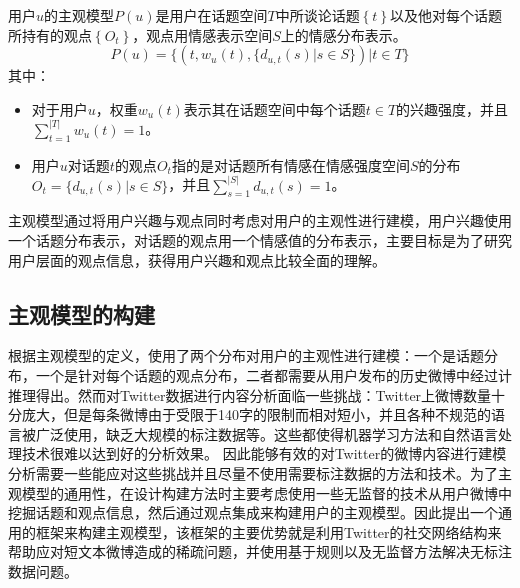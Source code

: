 \begin{definition}[主观模型]
用户$ u $的主观模型$ P \left( u \right) $是用户在话题空间$T$中所谈论话题$\left\lbrace  t \right\rbrace $以及他对每个话题所持有的观点$\left\lbrace O_{t}\right\rbrace $，观点用情感表示空间$ S $上的情感分布表示。
\begin{equation}
\label{usermodel}
P \left( u \right) = \lbrace \left( t, w_{u} \left( t \right), \lbrace d_{u,t} \left( s \right)|s \in S \rbrace \right) |  t \in T \rbrace
\end{equation}
其中：
\begin{itemize}
\item 对于用户$ u $，权重$ w_{u} \left( t \right)$表示其在话题空间中每个话题$t \in T$的兴趣强度，并且$ \sum_{t=1}^{|T|}w_{u} \left( t \right)=1 $。
\item 用户$ u $对话题$t$的观点$O_{t}$指的是对话题所有情感在情感强度空间$ S $的分布$O_{t}=\lbrace d_{u,t} \left( s \right)|s \in S \rbrace $，并且$ \sum_{s=1}^{|S|} d_{u,t} \left( s \right)=1$。
\end{itemize}
\end{definition}

主观模型通过将用户兴趣与观点同时考虑对用户的主观性进行建模，用户兴趣使用一个话题分布表示，对话题的观点用一个情感值的分布表示，主要目标是为了研究用户层面的观点信息，获得用户兴趣和观点比较全面的理解。

\subsection{主观模型的构建}
\label{establish}
根据主观模型的定义，使用了两个分布对用户的主观性进行建模：一个是话题分布，一个是针对每个话题的观点分布，二者都需要从用户发布的历史微博中经过计推理得出。然而对Twitter数据进行内容分析面临一些挑战：Twitter上微博数量十分庞大，但是每条微博由于受限于140字的限制而相对短小，并且各种不规范的语言被广泛使用，缺乏大规模的标注数据等。这些都使得机器学习方法和自然语言处理技术很难以达到好的分析效果。
因此能够有效的对Twitter的微博内容进行建模分析需要一些能应对这些挑战并且尽量不使用需要标注数据的方法和技术。为了主观模型的通用性，在设计构建方法时主要考虑使用一些无监督的技术从用户微博中挖掘话题和观点信息，然后通过观点集成来构建用户的主观模型。因此提出一个通用的框架来构建主观模型，该框架的主要优势就是利用Twitter的社交网络结构来帮助应对短文本微博造成的稀疏问题，并使用基于规则以及无监督方法解决无标注数据问题。

